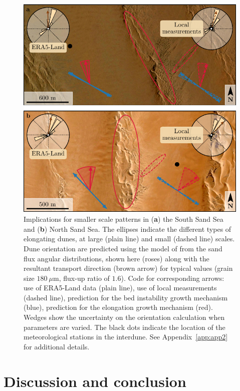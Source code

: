 \begin{figure}
\centering
\includegraphics[scale=1]{Figures/Figure9.pdf}
\caption{Implications for smaller scale patterns in (\textbf{a}) the South Sand Sea and (\textbf{b}) North Sand Sea. The ellipses indicate the different types of elongating dunes, at large (plain line) and small (dashed line) scales. Dune orientation are predicted using the model of \citet{Courrech2014} from the sand flux angular distributions, shown here (roses) along with the resultant transport direction (brown arrow) for typical values (grain size $180~\mu$m, flux-up ratio of $1.6$). Code for corresponding arrows: use of ERA5-Land data (plain line), use of local measurements (dashed line), prediction for the bed instability growth mechanism (blue), prediction for the elongation growth mechanism (red). Wedges show the uncertainty on the orientation calculation when parameters are varied. The black dots indicate the location of the meteorological stations in the interdune. See Appendix~\ref{app:app2} for additional details.}
\label{Fig9}
\end{figure}


\section{Discussion and conclusion}
\label{sec:sec4}


